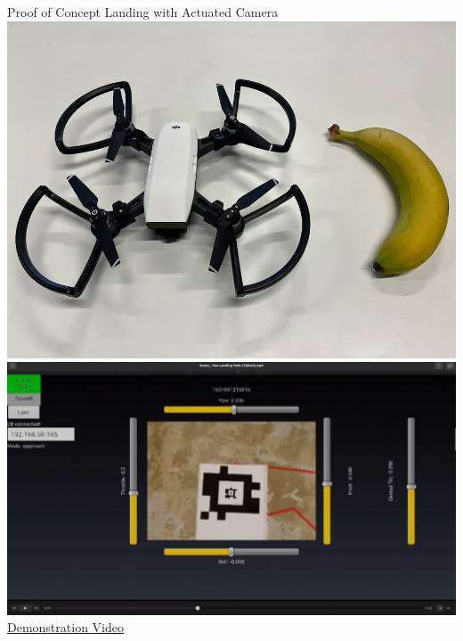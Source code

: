 \documentclass[aspectratio=169]{beamer}
\begin{document}
\begin{frame}{Proof of Concept Landing with Actuated Camera}
	\centering
	\includegraphics[height=0.55\textheight]{./images/dji_spark}
	\includegraphics[height=0.55\textheight]{./images/tablet_screenshot}
	\href{run:./autonomous_landing_demonstration_short.mp4}{Demonstration Video}
\end{frame}
\end{document}
